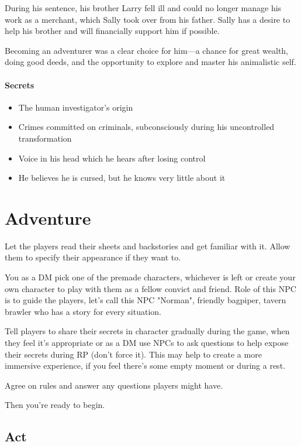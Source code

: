 \documentclass[10pt,onecolumn,twoside,openany,bg=full,layout=true]{dndbook}
\begin{document}
During his sentence, his brother Larry fell ill and could no longer manage his work as a merchant,
which Sally took over from his father.
Sally has a desire to help his brother and will financially support him if possible.

Becoming an adventurer was a clear choice for him—a chance for great wealth, doing good deeds, and the opportunity to
explore and master his animalistic self.

\subsubsection{Secrets}
\begin{itemize}
  \item The human investigator's origin
  \item Crimes committed on criminals, subconsciously during his uncontrolled transformation
  \item Voice in his head which he hears after losing control
  \item He believes he is cursed, but he knows very little about it
\end{itemize}

\vfill

\chapter{Adventure}\label{ch:adventure}
Let the players read their sheets and backstories and get familiar with it.
Allow them to specify their appearance if they want to.

You as a DM pick one of the premade characters, whichever is left or create your own character to play with them as a fellow convict and
friend.
Role of this NPC is to guide the players, let's call this NPC "Norman", friendly bagpiper, tavern brawler who has a story for every situation.

Tell players to share their secrets in character gradually during the game, when they feel it's appropriate or as a DM use
NPCs to ask questions to help expose their secrets during RP (don't force it).
This may help to create a more immersive experience, if you feel there's some empty moment or during a rest.

Agree on rules and answer any questions players might have.

Then you're ready to begin.

\setcounter{act_num}{1}

\section{Act }\label{sec:act-\roman{act_num}}
\addtocounter{act_num}{1}
\end{document}
